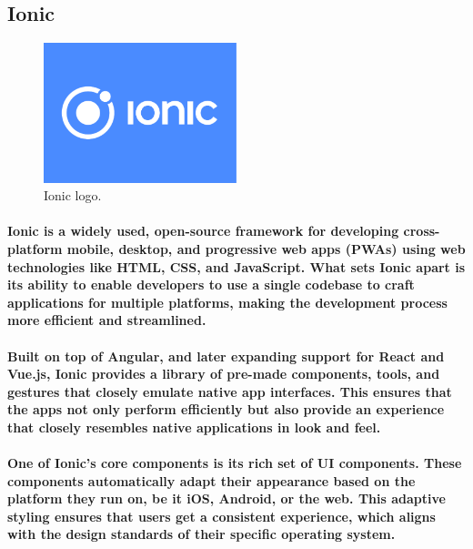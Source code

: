 \documentclass[12pt,a4paper]{article}
\begin{document}
    \subsection{Ionic}

    \begin{figure}[h!]
      \centering
      \includegraphics[width=0.5\textwidth]{ionic.png}
      \caption{Ionic logo.}
    \end{figure}

    \paragraph{Ionic is a widely used, open-source framework for developing cross-platform mobile, desktop, and progressive web apps (PWAs) using web technologies like HTML, CSS, and JavaScript. What sets Ionic apart is its ability to enable developers to use a single codebase to craft applications for multiple platforms, making the development process more efficient and streamlined.}
    
    \paragraph{Built on top of Angular, and later expanding support for React and Vue.js, Ionic provides a library of pre-made components, tools, and gestures that closely emulate native app interfaces. This ensures that the apps not only perform efficiently but also provide an experience that closely resembles native applications in look and feel.}
    
    \paragraph{One of Ionic’s core components is its rich set of UI components. These components automatically adapt their appearance based on the platform they run on, be it iOS, Android, or the web. This adaptive styling ensures that users get a consistent experience, which aligns with the design standards of their specific operating system.}
\end{document}
